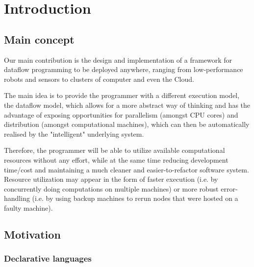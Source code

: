 \documentclass[sigplan,review,anonymous]{acmart}
\begin{document}

\maketitle

\section{Introduction} \label{sec:introduction}

\subsection{Main concept}

Our main contribution is the design and implementation of a framework for
dataflow programming to be deployed anywhere, ranging from low-performance
robots and sensors to clusters of computer and even the Cloud.

The main idea is to provide the programmer with a different execution model, the
dataflow model, which allows for a more abstract way of thinking and has the
advantage of exposing opportunities for parallelism (amongst CPU cores) and
distribution (amongst computational machines), which can then be automatically
realised by the "intelligent" underlying system.

Therefore, the programmer will be able to utilize available computational
resources without any effort, while at the same time reducing development
time/cost and maintaining a much cleaner and easier-to-refactor software system.
Resource utilization may appear in the form of faster execution (i.e. by
concurrently doing computations on multiple machines) or more robust
error-handling (i.e. by using backup machines to rerun nodes that were hosted
on a faulty machine).

\subsection{Motivation}

\subsubsection{Declarative languages}
\end{document}
